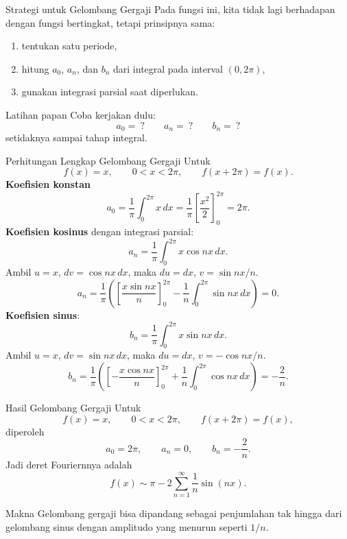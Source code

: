 \documentclass[aspectratio=169,10pt]{beamer}
\begin{document}
\begin{frame}{Strategi untuk Gelombang Gergaji}
Pada fungsi ini, kita tidak lagi berhadapan dengan fungsi bertingkat, tetapi prinsipnya sama:
\begin{enumerate}
  \item tentukan satu periode,
  \item hitung \(a_0\), \(a_n\), dan \(b_n\) dari integral pada interval \((0,2\pi)\),
  \item gunakan integrasi parsial saat diperlukan.
\end{enumerate}
\begin{block}{Latihan papan}
Coba kerjakan dulu:
\[
a_0=\ ? \qquad a_n=\ ? \qquad b_n=\ ?
\]
setidaknya sampai tahap integral.
\end{block}
\end{frame}


\begin{frame}{Perhitungan Lengkap Gelombang Gergaji}
\scriptsize
Untuk
\[
f(x)=x,
\qquad 0<x<2\pi,
\qquad f(x+2\pi)=f(x).
\]
\textbf{Koefisien konstan}
\[
a_0=\frac{1}{\pi}\int_0^{2\pi}x\,dx
=\frac{1}{\pi}\left[\frac{x^2}{2}\right]_0^{2\pi}=2\pi.
\]
\textbf{Koefisien kosinus} dengan integrasi parsial:
\[
a_n=\frac{1}{\pi}\int_0^{2\pi}x\cos nx\,dx.
\]
Ambil \(u=x\), \(dv=\cos nx\,dx\), maka \(du=dx\), \(v=\sin nx/n\).
\[
a_n=\frac{1}{\pi}\left(\left[\frac{x\sin nx}{n}\right]_0^{2\pi}-\frac{1}{n}\int_0^{2\pi}\sin nx\,dx\right)=0.
\]
\textbf{Koefisien sinus}:
\[
b_n=\frac{1}{\pi}\int_0^{2\pi}x\sin nx\,dx.
\]
Ambil \(u=x\), \(dv=\sin nx\,dx\), maka \(du=dx\), \(v=-\cos nx/n\).
\[
b_n=\frac{1}{\pi}\left(\left[-\frac{x\cos nx}{n}\right]_0^{2\pi}+\frac{1}{n}\int_0^{2\pi}\cos nx\,dx\right)=-\frac{2}{n}.
\]
\end{frame}

\begin{frame}{Hasil Gelombang Gergaji}
Untuk
\[
f(x)=x,
\qquad 0<x<2\pi,
\qquad f(x+2\pi)=f(x),
\]
diperoleh
\[
a_0=2\pi,
\qquad a_n=0,
\qquad b_n=-\frac{2}{n}.
\]
Jadi deret Fouriernnya adalah
\[
f(x)\sim \pi-2\sum_{n=1}^{\infty}\frac{1}{n}\sin(nx).
\]
\begin{exampleblock}{Makna}
Gelombang gergaji bisa dipandang sebagai penjumlahan tak hingga dari gelombang sinus dengan amplitudo yang menurun seperti \(1/n\).
\end{exampleblock}
\end{frame}
\end{document}
